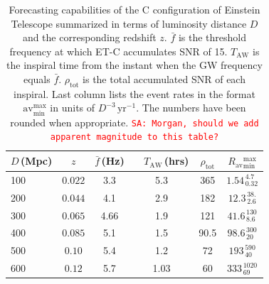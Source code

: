 \documentclass{aa}
\newcommand\T{\rule{0pt}{2.6ex}}       %
\newcommand\B{\rule[-1.2ex]{0pt}{0pt}} %
\newcommand{\sa}[1]{{\textcolor{red}{\texttt{SA: #1}} }}
\begin{document}
%
%
%
%
\begin{table}[h]
\caption{Forecasting capabilities of the C configuration of Einstein Telescope summarized in terms
of luminosity distance $D$ and the corresponding redshift $z$.
$\bar{f}$ is the threshold frequency at which ET-C accumulates SNR of 15.
$T_\text{AW}$ is the inspiral time from the instant when the GW frequency equals $\bar{f}$.
$\rho_\text{tot}$ is the total accumulated SNR of each inspiral.
Last column lists the event rates in the format $\text{av}^\text{max}_\text{min}$ in units of $D^{-3}\,\text{yr}^{-1}$.
The numbers have been rounded when appropriate.
\sa{Morgan, should we add apparent magnitude to this table?}}
\label{table:ET}
\centering
\begin{tabular}{lccccc}
\hline\hline
$D\,$(Mpc) &  $z$ & $\bar{f}\,$(Hz) & \ \hspace{1mm} $T_\text{AW}\,$(hrs)& ${\rho}_\text{tot}$ &$ R_\text{av}{}^\text{max}_\text{min}$ \T\B \\
\hline
100 & $ 0.022$ & 3.3 & 5.3 & 365 & $1.54^{\,4.7}_{\,0.32}$\T\B \\
200 & $ 0.044$ & 4.1 & 2.9 & 182 & $12.3^{\,38.}_{\,2.6}$ \T \B \\
300 & $ 0.065$ & 4.66 & 1.9 & 121 & $41.6^{\,130}_{\,8.6}$ \T \B \\
400 & $ 0.085$ & 5.1 & 1.5 & 90.5 & $98.6^{\,300}_{\,20}$ \T \B \\
500 & $ 0.10$ & 5.4 & 1.2 & 72 & $193^{\,590}_{\,40}$ \T \B \\
600 & $ 0.12$ & 5.7 & 1.03 & 60 & $333^{\,1020}_{\,69}$ \T \B \\
\hline\hline
\end{tabular}
\end{table}
%
%
%
%
%
\end{document}
